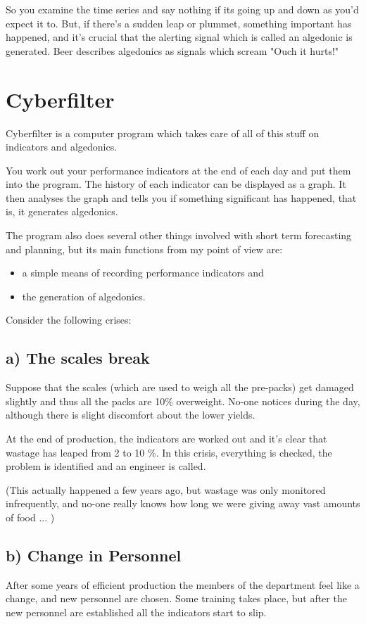 So you examine the time series and say nothing if its going up and down as you'd expect it to. But, if there's a sudden leap or plummet, something important has happened, and it's crucial that the alerting signal which is called an algedonic is generated. Beer describes algedonics as signals which scream "Ouch it hurts!"

\section*{Cyberfilter}
Cyberfilter is a computer program which takes care of all of this stuff on indicators and algedonics.

You work out your performance indicators at the end of each day and put them into the program. The history of each indicator can be displayed as a graph. It then analyses the graph and tells you if something significant has happened, that is, it generates algedonics.

The program also does several other things involved with short term forecasting and planning, but its main functions from my point of view are:

\begin{itemize}
  \item a simple means of recording performance indicators and

  \item the generation of algedonics.

\end{itemize}

Consider the following crises:

\subsection*{a) The scales break}
Suppose that the scales (which are used to weigh all the pre-packs) get damaged slightly and thus all the packs are 10\% overweight. No-one notices during the day, although there is slight discomfort about the lower yields.

At the end of production, the indicators are worked out and it's clear that wastage has leaped from 2 to 10 \%. In this crisis, everything is checked, the problem is identified and an engineer is called.

(This actually happened a few years ago, but wastage was only monitored infrequently, and no-one really knows how long we were giving away vast amounts of food ... )

\subsection*{b) Change in Personnel}
After some years of efficient production the members of the department feel like a change, and new personnel are chosen. Some training takes place, but after the new personnel are established all the indicators start to slip.


